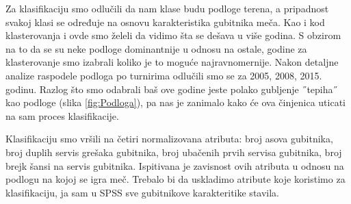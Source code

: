 \documentclass[a4paper]{article}
\begin{document}
Za klasifikaciju smo odlučili da nam klase budu podloge terena, a pripadnost svakoj klasi se određuje na osnovu karakteristika gubitnika meča.  {\color{red}{Možda i ovde da probamo da grupišemo prvo po podlogama, pa pripadnost da gađamo na osnovu proseka?}} Kao i kod klasterovanja i ovde smo želeli da vidimo šta se dešava u više godina. S obzirom na to da se su neke podloge dominantnije u odnosu na ostale, godine za klasterovanje smo izabrali koliko je to moguće najravnomernije. Nakon detaljne analize raspodele podloga po turnirima odlučili smo se za 2005, 2008, 2015. godinu. Razlog što smo odabrali baš ove godine jeste polako gubljenje ˝tepiha˝ kao podloge (slika \ref{fig:Podloga}), pa nas je zanimalo kako će ova činjenica uticati na sam proces klasifikacije. 

{\color{green}Klasifikaciju smo vršili na četiri normalizovana atributa: broj asova gubitnika, broj duplih servis grešaka gubitnika,
broj ubačenih prvih servisa gubitnika, broj brejk šansi na servis gubitnika. Ispitivana je zavisnost ovih atributa u odnosu 
na podlogu na kojoj se igra meč.}  {\color{red} Trebalo bi da uskladimo atribute koje koristimo za klasifikaciju, ja sam u SPSS sve gubitnikove karakteritike stavila.} 
\end{document}
